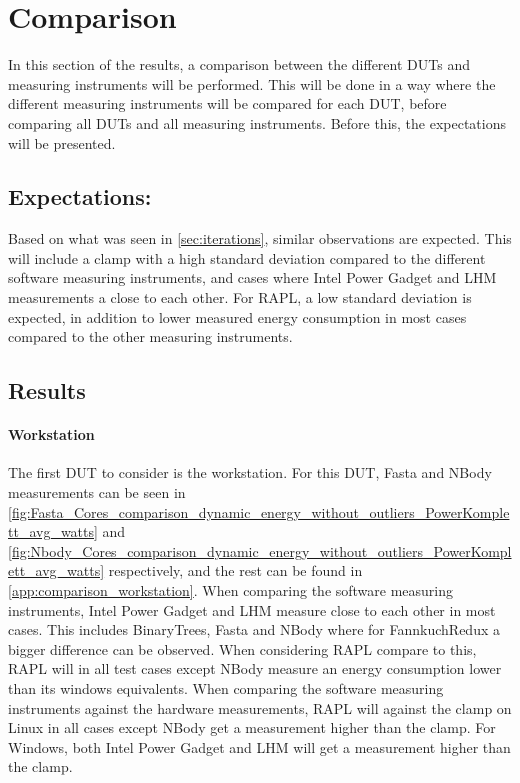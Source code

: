 \section{Comparison}\label{sec:comparison}

In this section of the results, a comparison between the different DUTs and measuring instruments will be performed. This will be done in a way where the different measuring instruments will be compared for each DUT, before comparing all DUTs and all measuring instruments. Before this, the expectations will be presented.

\subsection{Expectations:} Based on what was seen in \cref{sec:iterations}, similar observations are expected. This will include a clamp with a high standard deviation compared to the different software measuring instruments, and cases where Intel Power Gadget and LHM measurements a close to each other. For RAPL, a low standard deviation is expected, in addition to lower measured energy consumption in most cases compared to the other measuring instruments.

\subsection{Results}
\paragraph{Workstation}




The first DUT to consider is the workstation. For this DUT, Fasta and NBody measurements can be seen in \cref{fig:Fasta_Cores_comparison_dynamic_energy_without_outliers_PowerKomplett_avg_watts} and \cref{fig:Nbody_Cores_comparison_dynamic_energy_without_outliers_PowerKomplett_avg_watts} respectively, and the rest can be found in \cref{app:comparison_workstation}. When comparing the software measuring instruments, Intel Power Gadget and LHM measure close to each other in most cases. This includes BinaryTrees, Fasta and NBody where for FannkuchRedux a bigger difference can be observed. When considering RAPL compare to this, RAPL will in all test cases except NBody measure an energy consumption lower than its windows equivalents. When comparing the software measuring instruments against the hardware measurements, RAPL will against the clamp on Linux in all cases except NBody get a measurement higher than the clamp. For Windows, both Intel Power Gadget and LHM will get a measurement higher than the clamp.


